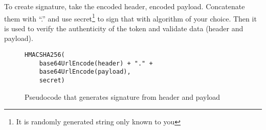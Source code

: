 To create signature, take the encoded header, encoded payload. Concatenate them with ``.'' and use secret\footnote{It is randomly generated string only known to you} to sign that with algorithm of your choice. Then it is used to verify the authenticity of the token and validate data (header and payload).

\begin{figure}[!htbp]
\begin{verbatim}
HMACSHA256(
    base64UrlEncode(header) + "." +
    base64UrlEncode(payload),
    secret)
\end{verbatim}
\renewcommand\figurename{Code}
\caption{Pseudocode that generates signature from header and payload}
\label{src:signature}
\end{figure}

